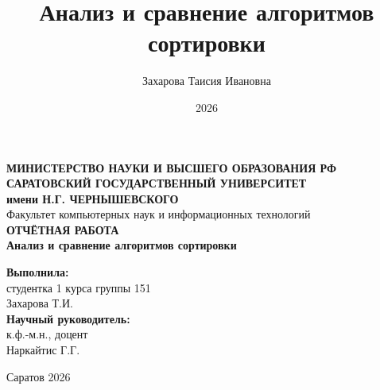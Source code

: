 \documentclass[coursework]{SCWorks}
\title{Анализ и сравнение алгоритмов сортировки}
\author{Захарова Таисия Ивановна}
\date{2026}
\begin{document}
\begin{titlepage}
\centering
\vspace*{1cm}
{\Large \textbf{МИНИСТЕРСТВО НАУКИ И ВЫСШЕГО ОБРАЗОВАНИЯ РФ}} \\[0.3cm]
{\large \textbf{САРАТОВСКИЙ ГОСУДАРСТВЕННЫЙ УНИВЕРСИТЕТ}} \\[0.2cm]
{\large \textbf{имени Н.Г. ЧЕРНЫШЕВСКОГО}} \\[1cm]
{\large Факультет компьютерных наук и информационных технологий} \\[2cm]
{\Large \textbf{ОТЧЁТНАЯ РАБОТА}} \\[0.8cm]
{\huge \textbf{Анализ и сравнение алгоритмов сортировки}} \\[3cm]
\begin{flushright}
\textbf{Выполнила:} \\
студентка 1 курса группы 151 \\
Захарова Т.И. \\[0.8cm]
\textbf{Научный руководитель:} \\
к.ф.-м.н., доцент \\
Наркайтис Г.Г.
\end{flushright}
\vfill
\centering
Саратов 2026
\end{titlepage}

\renewcommand{\contentsname}{Содержание}
\tableofcontents
\newpage









\end{document}
